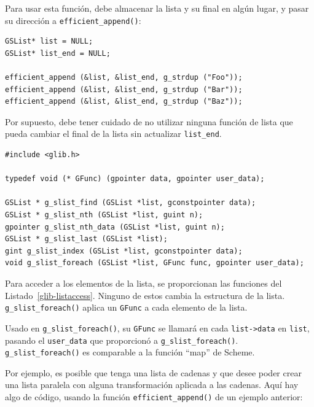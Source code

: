 Para usar esta función, debe almacenar la lista y su final en algún lugar, y pasar su dirección a \lstinline{efficient_append()}:
\begin{lstlisting}
GSList* list = NULL;
GSList* list_end = NULL;

efficient_append (&list, &list_end, g_strdup ("Foo"));
efficient_append (&list, &list_end, g_strdup ("Bar"));
efficient_append (&list, &list_end, g_strdup ("Baz"));
\end{lstlisting}

Por supuesto, debe tener cuidado de no utilizar ninguna función de lista que pueda cambiar el final de la lista sin actualizar \lstinline{list_end}.

\begin{lstlisting}[float, caption={Acceder a datos en una lista vinculada}, label=glib-listaccess]
#include <glib.h>

typedef void (* GFunc) (gpointer data, gpointer user_data);

GSList * g_slist_find (GSList *list, gconstpointer data);
GSList * g_slist_nth (GSList *list, guint n);
gpointer g_slist_nth_data (GSList *list, guint n);
GSList * g_slist_last (GSList *list);
gint g_slist_index (GSList *list, gconstpointer data);
void g_slist_foreach (GSList *list, GFunc func, gpointer user_data);
\end{lstlisting}

Para acceder a los elementos de la lista, se proporcionan las funciones del Listado~\ref{glib-listaccess}. Ninguno de estos cambia la estructura de la lista. \lstinline{g_slist_foreach()} aplica un \lstinline{GFunc} a cada elemento de la lista.

Usado en \lstinline{g_slist_foreach()}, su \lstinline{GFunc} se llamará en cada \lstinline{list->data} en \lstinline{list}, pasando el \lstinline{user_data} que proporcionó a \lstinline{g_slist_foreach()}. \lstinline{g_slist_foreach()} es comparable a la función ``map'' de Scheme.

Por ejemplo, es posible que tenga una lista de cadenas y que desee poder crear una lista paralela con alguna transformación aplicada a las cadenas. Aquí hay algo de código, usando la función \lstinline{efficient_append()} de un ejemplo anterior:

